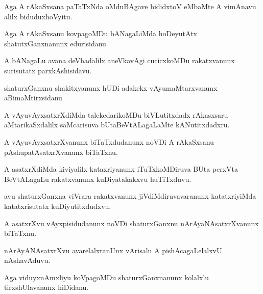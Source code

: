 \documentclass{article}
\begin{document}
\begin{mn}%
Aga A rAkaSxsana paTaTxNda oMduBAgave bididxtoV eMbaMte A vimAnavu alilx biduduxhoVyitu.
\end{mn}

\begin{mn}%
Aga A rAkaSxsanu kovpagoMDu bANagaLiMda hoDeyutAtx shatutxGanxnanunx edurisidanu.
\end{mn}

\begin{mn}%
A bANagaLu avana deVhadalilx aneVkavAgi cucicxkoMDu rakatxvanunx surisutatx parxkAshisidavu.
\end{mn}

\begin{mn}%
shaturxGanxnu shakitxyanunx hUDi adakekx vAyumaMtarxvanunx aBimaMtirxsidanu
\end{mn}

\begin{mn}%
A vAyuvAyxsatxrXdiMda talekedarikoMDu biVLutitxdadx rAkasxsaru aMtarikaSxdalilx 
saMcarisuva bUtaBeVtALagaLaMte kANutitxdadxru.
\end{mn}

\begin{mn}%
A vAyuvAyxsatxrXvanunx biTaTxdudanunx noVDi A rAkaSxsanu pAshupatAsatxrXvanunx biTaTxnu.
\end{mn}

\begin{mn}%
A asatxrXdiMda kiviyalilx kataxriyanunx iTuTxkoMDiruva BUta perxVta BeVtALagaLu rakatxvanunx 
kuDiyatakakxvu huTiTxduvu.
\end{mn}

\begin{mn}%
avu shaturxGanxna  viVrara rakatxvanunx jiVdiMdiruvavaranunx katatxriyiMda katatxrisutatx 
kuDiyutitxdudxvu.
\end{mn}

\begin{mn}%
A asatxrXvu vAyxpisidudanunx noVDi shaturxGanxnu nArAyaNAsatxrXvanunx biTaTxnu. 
\end{mn}

\begin{mn}%
nArAyANAsatxrXvu avarelalxranUnx vArisalu A pishAcagaLelalxvU nAshavAduvu.
\end{mn}

\begin{mn}%
Aga viduyxnAmxliyu koVpagoMDu shaturxGanxnanunx kolalxlu tirxshUlavanunx hiDidanu.
\end{mn}
\end{document}

